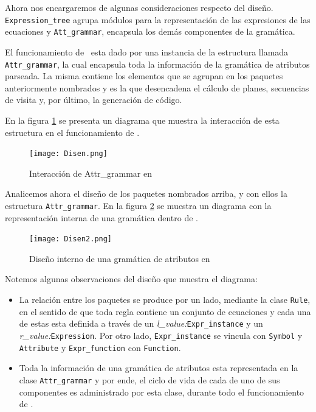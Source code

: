Ahora nos encargaremos de algunas consideraciones respecto del diseño. 
\texttt{Expression\_tree} agrupa módulos para la representación de las expresiones de las ecuaciones y \texttt{Att\_grammar}, encapsula los demás componentes de la gramática.

El funcionamiento de \maggen\ esta dado por una instancia de la estructura llamada \texttt{Attr\_grammar}, la cual encapsula toda la información de la gramática de atributos parseada. La misma contiene los elementos que se agrupan en los paquetes anteriormente nombrados y es la que desencadena el cálculo de planes, secuencias de visita y, por último, la generación de código. 
 
En la figura \ref{fig:disen} se presenta un diagrama que muestra la interacción de esta estructura en el funcionamiento de \maggen.

\begin{figure}[h!]\centering
\texttt{[image: Disen.png]}
\caption{\label{fig:disen}Interacción de Attr\_grammar en \maggen}
\end{figure}

Analicemos ahora el diseño de los paquetes nombrados arriba, y con ellos la estructura \texttt{Attr\_grammar}.  En la figura \ref{fig:disen2} se muestra un diagrama con la representación interna de una gramática dentro de \maggen.

\begin{figure}[h!]\centering
\texttt{[image: Disen2.png]}
\caption{\label{fig:disen2}Diseño interno de una gramática de atributos en \maggen}
\end{figure}

Notemos algunas observaciones del diseño que muestra el diagrama:

\begin{itemize}
\item La relación entre los paquetes se produce por un lado, mediante la clase \texttt{Rule}, en el sentido de que toda regla contiene un conjunto de ecuaciones y cada una de estas esta definida a través de un \textit{l\_value:}\texttt{Expr\_instance} y un \textit{r\_value:}\texttt{Expression}. Por otro lado, \texttt{Expr\_instance} se vincula con \texttt{Symbol} y \texttt{Attribute} y \texttt{Expr\_function} con \texttt{Function}.

\item Toda la información de una gramática de atributos esta representada en la clase \texttt{Attr\_grammar} y por ende, el ciclo de vida de cada de uno de sus componentes es administrado por esta clase, durante todo el funcionamiento de \maggen. 
\end{itemize}

